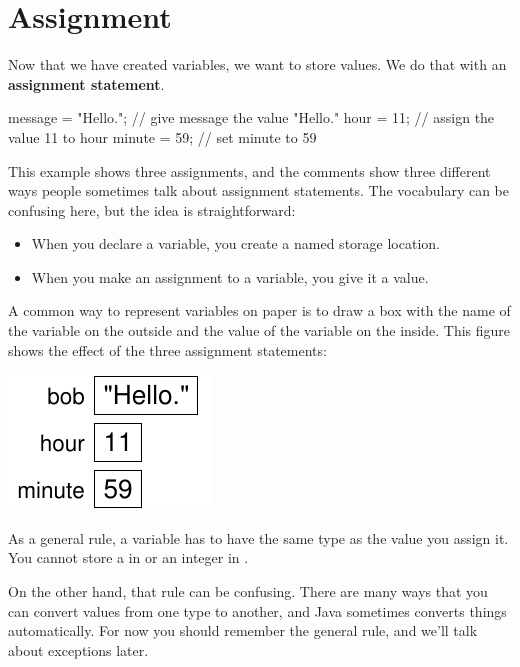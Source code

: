 \section{Assignment}


Now that we have created variables, we want to store values.
We do that with an {\bf assignment statement}.

\begin{code}
    message = "Hello.";  // give message the value "Hello."
    hour = 11;           // assign the value 11 to hour
    minute = 59;         // set minute to 59
\end{code}

This example shows three assignments, and the comments show three different ways people sometimes talk about assignment statements.
The vocabulary can be confusing here, but the idea is straightforward:

\begin{itemize}
\item When you declare a variable, you create a named storage location.
\item When you make an assignment to a variable, you give it a value.
\end{itemize}

A common way to represent variables on paper is to draw a box with the name of the variable on the outside and the value of the variable on the inside.
This figure shows the effect of the three assignment statements:

\begin{center}
\includegraphics{assign.pdf}  %
\end{center}

As a general rule, a variable has to have the same type as the value you assign it.
You cannot store a  in  or an integer in .

On the other hand, that rule can be confusing.
There are many ways that you can convert values from one type to another, and Java sometimes converts things automatically.
For now you should remember the general rule, and we'll talk about exceptions later.

